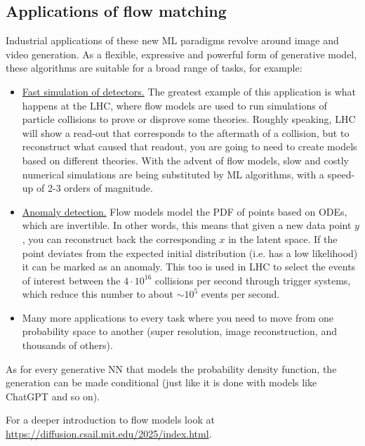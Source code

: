 \subsection{Applications of flow matching}
Industrial applications of these new ML paradigms revolve around image and video generation. As a flexible, expressive and powerful form of generative model, these algorithms are suitable for a broad range of tasks, for example:
\begin{itemize}
    \item[-] \underline{Fast simulation of detectors.} The greatest example of this application is what happens at the LHC, where flow models are used to run simulations of particle collisions to prove or disprove some theories. Roughly speaking, LHC will show a read-out that corresponds to the aftermath of a collision, but to reconstruct what caused that readout, you are going to need to create models based on different theories. With the advent of flow models, slow and costly numerical simulations are being substituted by ML algorithms, with a speed-up of 2-3 orders of magnitude.
    \item[-] \underline{Anomaly detection.} Flow models model the PDF of points based on ODEs, which are invertible. In other words, this means that given a new data point $y$, you can reconstruct back the corresponding $x$ in the latent space. If the point deviates from the expected initial distribution (i.e. has a low likelihood) it can be marked as an anomaly. This too is used in LHC to select the events of interest between the $4 \cdot 10^{16}$ collisions per second through trigger systems, which reduce this number to about $\sim 10^5$ events per second.
    \item[-] Many more applications to every task where you need to move from one probability space to another (super resolution, image reconstruction, and thousands of others).
\end{itemize}

As for every generative NN that models the probability density function, the generation can be made conditional (just like it is done with models like ChatGPT and so on).

For a deeper introduction to flow models look at \url{https://diffusion.csail.mit.edu/2025/index.html}.
